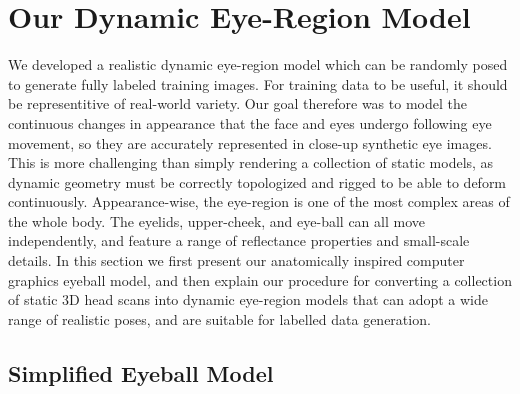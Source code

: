 


\section{Our Dynamic Eye-Region Model}



We developed a realistic dynamic eye-region model which can be randomly posed to generate fully labeled training images.
For training data to be useful, it should be representitive of real-world variety.
Our goal therefore was to model the continuous changes in appearance that the face and eyes undergo following eye movement, so they are accurately represented in close-up synthetic eye images.
This is more challenging than simply rendering a collection of static models, as dynamic geometry must be correctly topologized and rigged to be able to deform continuously.
Appearance-wise, the eye-region is one of the most complex areas of the whole body. The eyelids, upper-cheek, and eye-ball can all move independently, and feature a range of reflectance properties and small-scale details.
%
In this section we first present our anatomically inspired computer graphics eyeball model, and then explain our procedure for converting a collection of static 3D head scans into dynamic eye-region models that can adopt a wide range of realistic poses, and are suitable for labelled data generation.



\subsection{Simplified Eyeball Model}
\label{subsec:eyeball_model}

